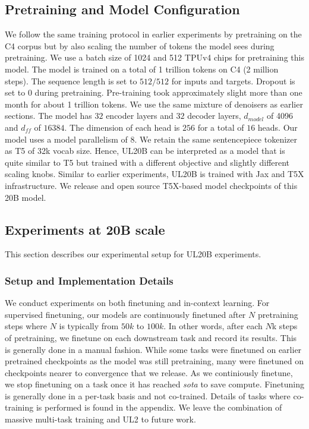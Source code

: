 \documentclass[10pt]{article}
\begin{document}
\subsection{Pretraining and Model Configuration}
We follow the same training protocol in earlier experiments by pretraining on the C4 corpus but by also scaling the number of tokens the model sees during pretraining. We use a batch size of 1024 and 512 TPUv4 chips for pretraining this model. The model is trained on a total of 1 trillion tokens on C4 (2 million steps). The sequence length is set to $512/512$ for inputs and targets. Dropout is set to $0$ during pretraining. Pre-training took approximately slight more than one month for about 1 trillion tokens. We use the same mixture of denoisers as earlier sections. The model has $32$ encoder layers and $32$ decoder layers, $d_{model}$ of 4096 and $d_{ff}$ of $16384$. The dimension of each head is $256$ for a total of $16$ heads. Our model uses a model parallelism of $8$. We retain the same sentencepiece tokenizer as T5 of 32k vocab size. Hence, UL20B can be interpreted as a model that is quite similar to T5 but trained with a different objective and slightly different scaling knobs. Similar to earlier experiments, UL20B is trained with Jax and T5X infrastructure. We release and open source T5X-based model checkpoints of this 20B model.


\subsection{Experiments at 20B scale}
This section describes our experimental setup for UL20B experiments.
\subsubsection{Setup and Implementation Details}
We conduct experiments on both finetuning and in-context learning. For supervised finetuning, our models are continuously finetuned after $N$ pretraining steps where $N$ is typically from $50k$ to $100k$. In other words, after each $N$k steps of pretraining, we finetune on each downstream task and record its results. This is generally done in a manual fashion. While some tasks were finetuned on earlier pretrained checkpoints as the model was still pretraining, many were finetuned on checkpoints nearer to convergence that we release. As we continiously finetune, we stop finetuning on a task once it has reached \textit{sota} to save compute. Finetuning is generally done in a per-task basis and not co-trained. Details of tasks where co-training is performed is found in the appendix. We leave the combination of massive multi-task training \citep{aribandi2021ext5} and UL2 to future work. 
\end{document}
